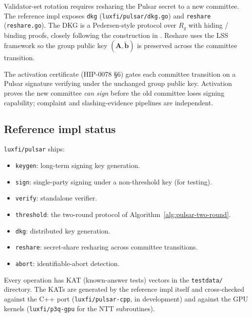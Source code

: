 Validator-set rotation requires resharing the Pulsar secret to a new
committee. The reference impl exposes \texttt{dkg}
(\texttt{luxfi/pulsar/dkg.go}) and \texttt{reshare}
(\texttt{reshare.go}). The DKG is a Pedersen-style protocol over $R_q$ with
hiding / binding proofs, closely following the construction in
\cite{krt24,gks24}. Reshare uses the LSS framework \cite{luxlssmpc} so the
group public key $(\mathbf{A}, \tilde{\mathbf{b}})$ is preserved across
the committee transition.

The activation certificate (HIP-0078 §6) gates each committee transition on
a Pulsar signature verifying under the unchanged group public key.
Activation proves the new committee \emph{can sign} before the old committee
loses signing capability; complaint and slashing-evidence pipelines are
independent.

\subsection{Reference impl status}

\texttt{luxfi/pulsar} ships:

\begin{itemize}[leftmargin=2em,nosep]
  \item \texttt{keygen}: long-term signing key generation.
  \item \texttt{sign}: single-party signing under a non-threshold key
    (for testing).
  \item \texttt{verify}: standalone verifier.
  \item \texttt{threshold}: the two-round protocol of
    Algorithm~\ref{alg:pulsar-two-round}.
  \item \texttt{dkg}: distributed key generation.
  \item \texttt{reshare}: secret-share resharing across committee
    transitions.
  \item \texttt{abort}: identifiable-abort detection.
\end{itemize}

Every operation has KAT (known-answer tests) vectors in the
\texttt{testdata/} directory. The KATs are generated by the reference impl
itself and cross-checked against the C++ port (\texttt{luxfi/pulsar-cpp},
in development) and against the GPU kernels (\texttt{luxfi/p3q-gpu} for the
NTT subroutines).

